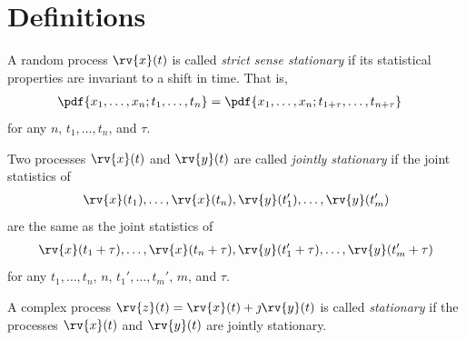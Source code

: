 \section{Definitions}
\begin{definitionBox}
    A random process $\rv{x}(t)$ is called \emph{strict sense stationary} if its statistical properties are invariant to a shift in time. That is,
    \begin{align}
        \pdf{x_{1}, \ldots, x_{n}; t_{1}, \ldots, t_{n}} &=
        \pdf{x_{1}, \ldots, x_{n}; t_{1+\tau}, \ldots, t_{n+\tau}}
    \end{align}
    for any $n$, $t_{1}, \ldots, t_{n}$, and $\tau$.
\end{definitionBox}

\begin{definitionBox}
    Two processes $\rv{x}(t)$ and $\rv{y}(t)$ are called \emph{jointly stationary} if the joint statistics of 
    \begin{align}
        \rv{x}(t_{1}), \ldots, \rv{x}(t_{n}), \rv{y}(t_{1}^{\prime}), \ldots, \rv{y}(t_{m}^{\prime})
    \end{align}
    are the same as the joint statistics of 
    \begin{align}
        \rv{x}(t_{1} + \tau), \ldots, \rv{x}(t_{n} + \tau), \rv{y}(t_{1}^{\prime} + \tau), \ldots, \rv{y}(t_{m}^{\prime} + \tau)
    \end{align}
    for any $t_{1}, \ldots, t_{n}$, $n$, $t_{1}', \ldots, t_{m}'$, $m$, and $\tau$. 
\end{definitionBox}

\begin{definitionBox}
    A complex process $\rv{z}(t) = \rv{x}(t) + \jmath \rv{y}(t)$ is called \emph{stationary} if the processes $\rv{x}(t)$ and $\rv{y}(t)$ are jointly stationary.
\end{definitionBox}

